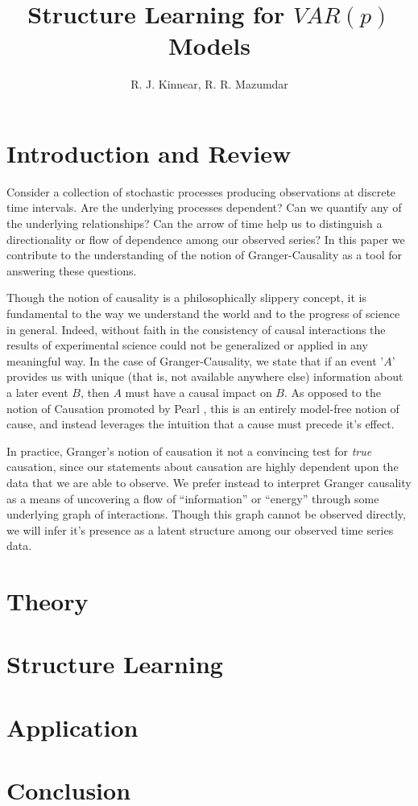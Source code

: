 \documentclass[12pt]{article}
\title{Structure Learning for $VAR(p)$ Models}
\author{R. J. Kinnear, R. R. Mazumdar}
\begin{document}
\maketitle
{}

\section{Introduction and Review}
Consider a collection of stochastic processes producing observations
at discrete time intervals.  Are the underlying processes dependent?
Can we quantify any of the underlying relationships?  Can the arrow of
time help us to distinguish a directionality or flow of dependence
among our observed series?  In this paper we contribute to the
understanding of the notion of Granger-Causality
\cite{granger1969investigating} as a tool for answering these questions.

Though the notion of causality is a philosophically slippery concept,
it is fundamental to the way we understand the world and to the
progress of science in general.  Indeed, without faith in the
consistency of causal interactions the results of experimental science
could not be generalized or applied in any meaningful way.  In the
case of Granger-Causality, we state that if an event '$A$' provides us
with unique (that is, not available anywhere else) information about a
later event $B$, then $A$ must have a causal impact on $B$.  As
opposed to the notion of Causation promoted by Pearl
\cite{pearl2000art}, this is an entirely model-free notion of cause,
and instead leverages the intuition that a cause must precede it's
effect.

In practice, Granger's notion of causation it not a convincing test
for \textit{true} causation, since our statements about causation are
highly dependent upon the data that we are able to observe.  We prefer
instead to interpret Granger causality as a means of uncovering a flow
of ``information'' or ``energy'' through some underlying graph of
interactions.  Though this graph cannot be observed directly, we will
infer it's presence as a latent structure among our observed time
series data.

\section{Theory}
\section{Structure Learning} 
\section{Application}
\section{Conclusion}

\printbibliography
\end{document}
